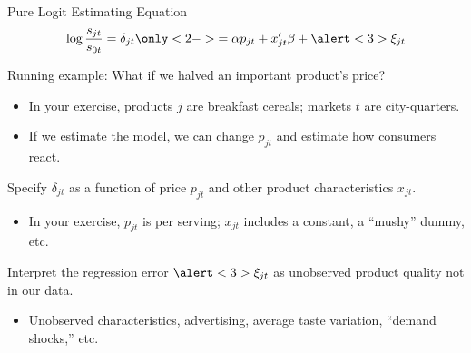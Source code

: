 \documentclass[aspectratio=169,t,11pt,table]{beamer}
\begin{document}
\begin{frame}{Pure Logit Estimating Equation}
    \vspace{-\baselineskip}
    \begin{equation*}
        \log\frac{s_{jt}}{s_{0t}} = \delta_{jt} \only<2->{= \alpha p_{jt} + x_{jt}'\beta + \alert<3>{\xi_{jt}}}
    \end{equation*}
    \vspace{-0.5\baselineskip}
    \begin{wideitemize}
        \item Running example: What if we halved an important product's price?
        \begin{itemize}
            \item In your exercise, products $j$ are breakfast cereals; markets $t$ are city-quarters.
            \item If we estimate the model, we can change $p_{jt}$ and estimate how consumers react.
        \end{itemize}
        \pause
        \item Specify $\delta_{jt}$ as a function of price $p_{jt}$ and other product characteristics $x_{jt}$.
        \begin{itemize}
            \item In your exercise, $p_{jt}$ is per serving; $x_{jt}$ includes a constant, a ``mushy'' dummy, etc.
        \end{itemize}
        \pause
        \item Interpret the regression error $\alert<3>{\xi_{jt}}$ as unobserved product quality not in our data.
        \begin{itemize}
            \item Unobserved characteristics, advertising, average taste variation, ``demand shocks,'' etc.
        \end{itemize}
    \end{wideitemize}
\end{frame}
\end{document}
